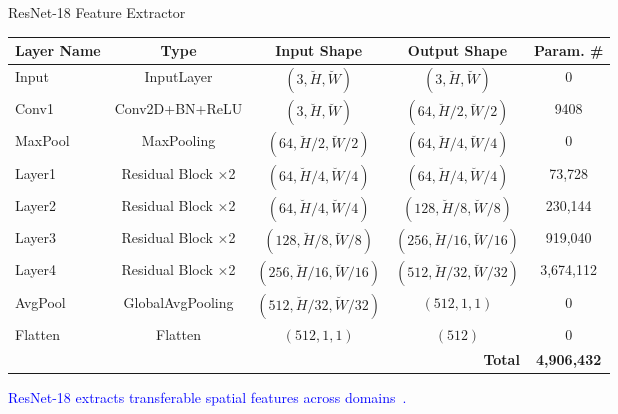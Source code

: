 \documentclass[aspectratio=169]{beamer}
\let\oldcite\cite %
\renewcommand{\cite}[1]{{\tiny\oldcite{#1}}}
\begin{document}




\begin{frame}{ResNet-18 Feature Extractor}
\begin{table}
\begin{tabularx}{\linewidth}{lcccc}
\toprule
\textbf{Layer Name} & \textbf{Type} & \textbf{Input Shape} & \textbf{Output Shape} & \textbf{Param. \#} \\
\midrule
Input & InputLayer & $(3, \breve{H}, \breve{W})$ & $(3, \breve{H}, \breve{W})$ & 0 \\
Conv1 & Conv2D+BN+ReLU & $(3, \breve{H}, \breve{W})$ & $(64, \breve{H}/2, \breve{W}/2)$ & 9408 \\
MaxPool & MaxPooling & $(64, \breve{H}/2, \breve{W}/2)$ & $(64, \breve{H}/4, \breve{W}/4)$ & 0 \\
Layer1 & Residual Block $\times$2 & $(64, \breve{H}/4, \breve{W}/4)$ & $(64, \breve{H}/4, \breve{W}/4)$ & 73,728 \\
Layer2 & Residual Block $\times$2 & $(64, \breve{H}/4, \breve{W}/4)$ & $(128, \breve{H}/8, \breve{W}/8)$ & 230,144 \\
Layer3 & Residual Block $\times$2 & $(128, \breve{H}/8, \breve{W}/8)$ & $(256, \breve{H}/16, \breve{W}/16)$ & 919,040 \\
Layer4 & Residual Block $\times$2 & $(256, \breve{H}/16, \breve{W}/16)$ & $(512, \breve{H}/32, \breve{W}/32)$ & 3,674,112 \\
AvgPool & GlobalAvgPooling & $(512, \breve{H}/32, \breve{W}/32)$ & $(512, 1, 1)$ & 0 \\
Flatten & Flatten & $(512,1,1)$ & $(512)$ & 0 \\
\midrule
\multicolumn{4}{r}{\textbf{Total}} & \textbf{4,906,432} \\
\midrule
\end{tabularx}
\end{table}
\begin{center}
    \textcolor{blue}{ResNet-18 extracts transferable spatial features across domains~\cite{diagnostics11061071}.}
\end{center}
\end{frame}
\end{document}

